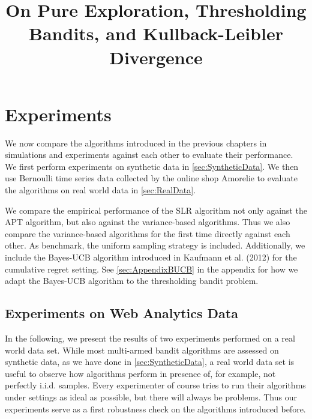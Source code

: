 \documentclass[11pt,]{article}
\title{On Pure Exploration, Thresholding Bandits, and Kullback-Leibler
Divergence}
\author{}
\date{}
\begin{document}
\maketitle

{
\hypersetup{linkcolor=black}
\setcounter{tocdepth}{2}
\tableofcontents
}
\newpage

\section{\texorpdfstring{Experiments
\label{chap:Experiments}}{Experiments }}\label{experiments}

We now compare the algorithms introduced in the previous chapters in
simulations and experiments against each other to evaluate their
performance. We first perform experiments on synthetic data in
\autoref{sec:SyntheticData}. We then use Bernoulli time series data
collected by the online shop Amorelie to evaluate the algorithms on real
world data in \autoref{sec:RealData}.

We compare the empirical performance of the SLR algorithm not only
against the APT algorithm, but also against the variance-based
algorithms. Thus we also compare the variance-based algorithms for the
first time directly against each other. As benchmark, the uniform
sampling strategy is included. Additionally, we include the Bayes-UCB
algorithm introduced in Kaufmann et al. (2012) for the cumulative regret
setting. See \autoref{sec:AppendixBUCB} in the appendix for how we adapt
the Bayes-UCB algorithm to the thresholding bandit problem.

\subsection{\texorpdfstring{Experiments on Web Analytics Data
\label{sec:RealData}}{Experiments on Web Analytics Data }}\label{experiments-on-web-analytics-data}

In the following, we present the results of two experiments performed on
a real world data set. While most multi-armed bandit algorithms are
assessed on synthetic data, as we have done in
\autoref{sec:SyntheticData}, a real world data set is useful to observe
how algorithms perform in presence of, for example, not perfectly i.i.d.
samples. Every experimenter of course tries to run their algorithms
under settings as ideal as possible, but there will always be problems.
Thus our experiments serve as a first robustness check on the algorithms
introduced before.
\end{document}
